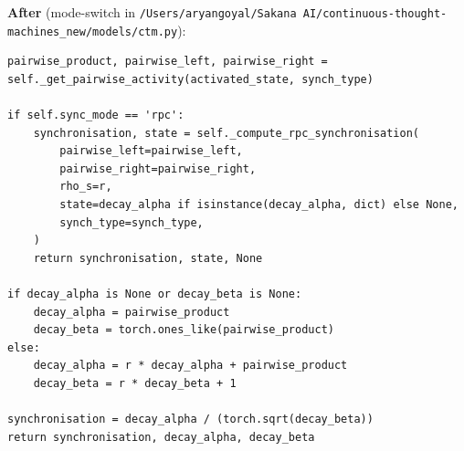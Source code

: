 \documentclass[11pt]{article}
\begin{document}
\textbf{After} (mode-switch in \texttt{/Users/aryangoyal/Sakana AI/continuous-thought-machines\_new/models/ctm.py}):
\begin{lstlisting}[style=pycode]
pairwise_product, pairwise_left, pairwise_right = self._get_pairwise_activity(activated_state, synch_type)

if self.sync_mode == 'rpc':
    synchronisation, state = self._compute_rpc_synchronisation(
        pairwise_left=pairwise_left,
        pairwise_right=pairwise_right,
        rho_s=r,
        state=decay_alpha if isinstance(decay_alpha, dict) else None,
        synch_type=synch_type,
    )
    return synchronisation, state, None

if decay_alpha is None or decay_beta is None:
    decay_alpha = pairwise_product
    decay_beta = torch.ones_like(pairwise_product)
else:
    decay_alpha = r * decay_alpha + pairwise_product
    decay_beta = r * decay_beta + 1

synchronisation = decay_alpha / (torch.sqrt(decay_beta))
return synchronisation, decay_alpha, decay_beta
\end{lstlisting}
\end{document}
